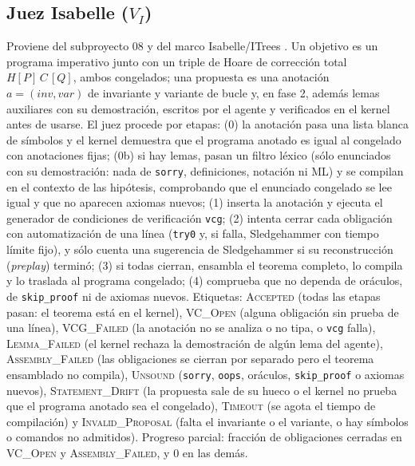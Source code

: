 \documentclass[11pt,a4paper]{article}
\begin{document}
\subsection{Juez Isabelle ($V_I$)}

Proviene del subproyecto 08 y del marco Isabelle/ITrees \citep{BryantHuertaFoster2026}. Un objetivo es un programa imperativo junto con un triple de Hoare de corrección total $H[P]\,C\,[Q]$, ambos congelados; una propuesta es una anotación $a = (\mathit{inv}, \mathit{var})$ de invariante y variante de bucle y, en fase 2, además lemas auxiliares con su demostración, escritos por el agente y verificados en el kernel antes de usarse. El juez procede por etapas: (0) la anotación pasa una lista blanca de símbolos y el kernel demuestra que el programa anotado es igual al congelado con anotaciones fijas; (0b) si hay lemas, pasan un filtro léxico (sólo enunciados con su demostración: nada de \texttt{sorry}, definiciones, notación ni ML) y se compilan en el contexto de las hipótesis, comprobando que el enunciado congelado se lee igual y que no aparecen axiomas nuevos; (1) inserta la anotación y ejecuta el generador de condiciones de verificación \texttt{vcg}; (2) intenta cerrar cada obligación con automatización de una línea (\texttt{try0} y, si falla, Sledgehammer con tiempo límite fijo), y sólo cuenta una sugerencia de Sledgehammer si su reconstrucción (\emph{preplay}) terminó; (3) si todas cierran, ensambla el teorema completo, lo compila y lo traslada al programa congelado; (4) comprueba que no dependa de oráculos, de \texttt{skip\_proof} ni de axiomas nuevos. Etiquetas: \textsc{Accepted} (todas las etapas pasan: el teorema está en el kernel), \textsc{VC\_Open} (alguna obligación sin prueba de una línea), \textsc{VCG\_Failed} (la anotación no se analiza o no tipa, o \texttt{vcg} falla), \textsc{Lemma\_Failed} (el kernel rechaza la demostración de algún lema del agente), \textsc{Assembly\_Failed} (las obligaciones se cierran por separado pero el teorema ensamblado no compila), \textsc{Unsound} (\texttt{sorry}, \texttt{oops}, oráculos, \texttt{skip\_proof} o axiomas nuevos), \textsc{Statement\_Drift} (la propuesta sale de su hueco o el kernel no prueba que el programa anotado sea el congelado), \textsc{Timeout} (se agota el tiempo de compilación) y \textsc{Invalid\_Proposal} (falta el invariante o el variante, o hay símbolos o comandos no admitidos). Progreso parcial: fracción de obligaciones cerradas en \textsc{VC\_Open} y \textsc{Assembly\_Failed}, y $0$ en las demás.
\end{document}
